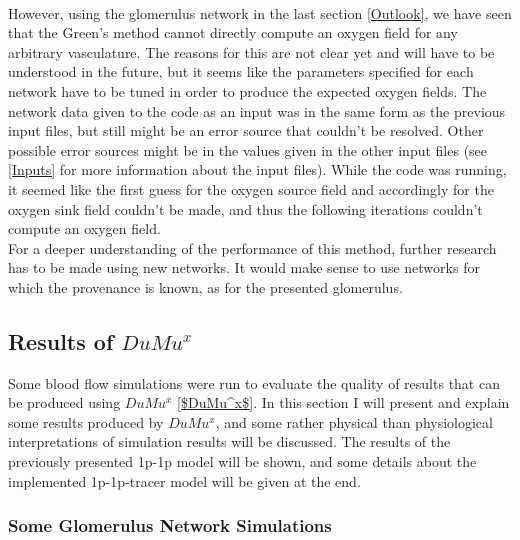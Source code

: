 \\However, using the glomerulus network in the last section \ref{Outlook}, we have seen that the Green's method cannot directly compute an oxygen field for any arbitrary vasculature. The reasons for this are not clear yet and will have to be understood in the future, but it seems like the parameters specified for each network have to be tuned in order to produce the expected oxygen fields. The network data given to the code as an input was in the same form as the previous input files, but still might be an error source that couldn't be resolved. Other possible error sources might be in the values given in the other input files (see \ref{Inputs} for more information about the input files). While the code was running, it seemed like the first guess for the oxygen source field and accordingly for the oxygen sink field couldn't be made, and thus the following iterations couldn't compute an oxygen field.
\\For a deeper understanding of the performance of this method, further research has to be made using new networks. It would make sense to use networks for which the provenance is known, as for the presented glomerulus.

\newpage
\subsection{Results of $DuMu^x$} 
\label{ResultsDum}

Some blood flow simulations were run to evaluate the quality of results that can be produced using $DuMu^x$ \ref{$DuMu^x$}. In this section I will present and explain some results produced by $DuMu^x$, and some rather physical than physiological interpretations of simulation results will be discussed. The results of the previously presented 1p-1p model will be shown, and some details about the implemented 1p-1p-tracer model will be given at the end.

\subsubsection*{Some Glomerulus Network Simulations}

